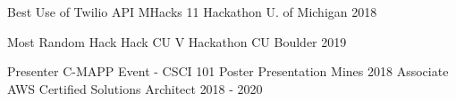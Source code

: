 

\begin{cvhonors}

  \cvhonor
    {Best Use of Twilio API} %
    {MHacks 11 Hackathon}
    {U. of Michigan} %
    {2018} %

  \cvhonor
    {Most Random Hack} %
    {Hack CU V Hackathon}
    {CU Boulder} %
    {2019} %

    \cvhonor
    {Presenter} %
    {C-MAPP Event - CSCI 101 Poster Presentation}
    {Mines} %
    {2018} %
  \cvhonor
    {Associate} %
    {AWS Certified Solutions Architect }
    {} %
    {2018 - 2020} %
    
\end{cvhonors}
